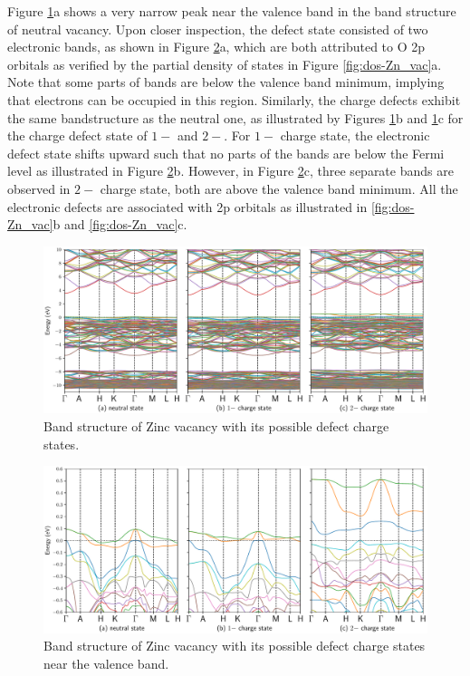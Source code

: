 Figure \ref{fig:band-Zn_vac}a shows a very narrow peak near the valence band in the band structure of neutral  vacancy. Upon closer inspection, the defect state consisted of two electronic bands, as shown in Figure \ref{fig:bandclose-Zn_vac}a, which are both attributed to O 2p orbitals as verified by the partial density of states in Figure \ref{fig:dos-Zn_vac}a. Note that some parts of bands are below the valence band minimum, implying that electrons can be occupied in this region. Similarly, the charge defects exhibit the same bandstructure as the neutral one, as illustrated by Figures \ref{fig:band-Zn_vac}b and \ref{fig:band-Zn_vac}c for the charge defect state of $1-$ and $2-$.  For $1-$ charge state, the electronic defect state shifts upward such that no parts of the bands are below the Fermi level as illustrated in Figure \ref{fig:bandclose-Zn_vac}b. However, in Figure \ref{fig:bandclose-Zn_vac}c, three separate bands are observed in $2-$ charge state, both are above the valence band minimum. All the electronic defects are associated with 2p orbitals as illustrated in \ref{fig:dos-Zn_vac}b and \ref{fig:dos-Zn_vac}c.

\begin{figure}[tbph!]
	\centering
	\includegraphics[width=1\textwidth]{"images/rnd/Zn_vac-band"}
	\caption[Band structure of Zinc vacancy with its possible defect charge states]{Band structure of Zinc vacancy with its possible defect charge states. }
	\label{fig:band-Zn_vac}
\end{figure}

\begin{figure}[tbph!]
	\centering
	\includegraphics[width=1\textwidth]{"images/rnd/Zn_vac-bandclose"}
	\caption[Band structure of Zinc vacancy with its possible defect charge states near the valence band]{Band structure of Zinc vacancy with its possible defect charge states near the valence band. }
	\label{fig:bandclose-Zn_vac}
\end{figure}

